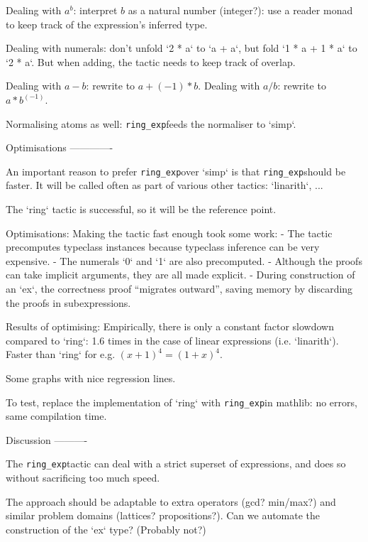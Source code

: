 \documentclass{article}
\newcommand{\ringexp}{\texttt{ring\_exp}}
\begin{document}
Dealing with $a ^ b$: interpret $b$ as a natural number (integer?):
use a reader monad to keep track of the expression's inferred type.

Dealing with numerals: don't unfold `2 * a` to `a + a`, but fold `1 * a + 1 * a` to `2 * a`.
But when adding, the tactic needs to keep track of overlap.

Dealing with $a - b$: rewrite to $a + (-1) * b$.
Dealing with $a / b$: rewrite to $a * b^(-1)$.

Normalising atoms as well: \ringexp feeds the normaliser to `simp`.

Optimisations
-------------

An important reason to prefer \ringexp over `simp` is that \ringexp should be faster.
It will be called often as part of various other tactics: `linarith`, ...

The `ring` tactic is successful, so it will be the reference point.

Optimisations:
Making the tactic fast enough took some work:
- The tactic precomputes typeclass instances because typeclass inference can be very expensive.
- The numerals `0` and `1` are also precomputed.
- Although the proofs can take implicit arguments, they are all made explicit.
- During construction of an `ex`, the correctness proof ``migrates outward'', saving memory by discarding the proofs in subexpressions.

Results of optimising:
Empirically, there is only a constant factor slowdown compared to `ring`:
1.6 times in the case of linear expressions (i.e. `linarith`).
Faster than `ring` for e.g. $(x + 1)^4 = (1 + x)^4$.

Some graphs with nice regression lines.

To test, replace the implementation of `ring` with \ringexp in mathlib: no errors, same compilation time.

Discussion
----------

The \ringexp tactic can deal with a strict superset of expressions,
and does so without sacrificing too much speed.

The approach should be adaptable to extra operators (gcd? min/max?) and similar problem domains (lattices? propositions?).
Can we automate the construction of the `ex` type? (Probably not?)
\end{document}
